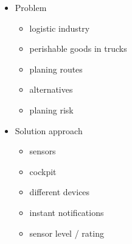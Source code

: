 \documentclass{acm_proc_article-sp}
\begin{document}
\begin{itemize}
	\item Problem
	\begin{itemize}
		\item logistic industry
		\item perishable goods in trucks
		\item planing routes
		\item alternatives
		\item planing risk
	\end{itemize}
	
	\item Solution approach
	\begin{itemize}
		\item sensors
		\item cockpit
		\item different devices
		\item instant notifications
		\item sensor level / rating
	\end{itemize}
	
\end{itemize}
\end{document}

